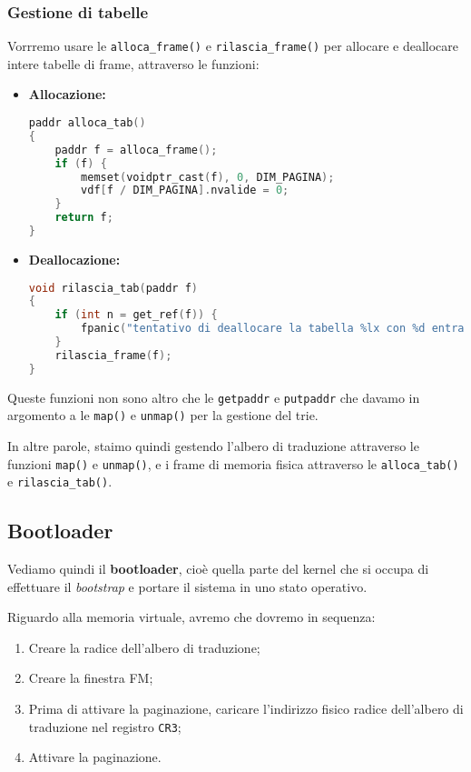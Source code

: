\documentclass[a4paper,11pt]{article}
\begin{document}
\subsubsection{Gestione di tabelle}
Vorrremo usare le \lstinline|alloca_frame()| e \lstinline|rilascia_frame()| per allocare e deallocare intere tabelle di frame, attraverso le funzioni:
\begin{itemize}
	\item \textbf{Allocazione:}
\begin{lstlisting}[language=C++, style=codestyle]	
paddr alloca_tab()
{
	paddr f = alloca_frame();
	if (f) {
		memset(voidptr_cast(f), 0, DIM_PAGINA);
		vdf[f / DIM_PAGINA].nvalide = 0;
	}
	return f;
}
\end{lstlisting}

	\item \textbf{Deallocazione:}
\begin{lstlisting}[language=C++, style=codestyle]	
void rilascia_tab(paddr f)
{
	if (int n = get_ref(f)) {
		fpanic("tentativo di deallocare la tabella %lx con %d entrate valide", f, n);
	}
	rilascia_frame(f);
}
\end{lstlisting}
\end{itemize}

Queste funzioni non sono altro che le \lstinline|getpaddr| e \lstinline|putpaddr| che davamo in argomento a le \lstinline|map()| e \lstinline|unmap()| per la gestione del trie.

In altre parole, staimo quindi gestendo l'albero di traduzione attraverso le funzioni \lstinline|map()| e \lstinline|unmap()|, e i frame di memoria fisica attraverso le \lstinline|alloca_tab()| e \lstinline|rilascia_tab()|.

\subsection{Bootloader}
Vediamo quindi il \textbf{bootloader}, cioè quella parte del kernel che si occupa di effettuare il \textit{bootstrap} e portare il sistema in uno stato operativo.

Riguardo alla memoria virtuale, avremo che dovremo in sequenza:
\begin{enumerate}
	\item Creare la radice dell'albero di traduzione;
	\item Creare la finestra FM;
	\item Prima di attivare la paginazione, caricare l'indirizzo fisico radice dell'albero di traduzione nel registro \lstinline|CR3|;
	\item Attivare la paginazione.
\end{enumerate}
\end{document}

